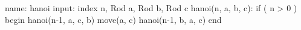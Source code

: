  \begin{algorithm}[language=pseudo,caption={Towers of Hanoi, recursive}]
   name: hanoi
   input: index n, Rod a, Rod b, Rod c
   hanoi(n, a, b, c):
   if ( n > 0 ) begin
   hanoi(n-1, a, c, b)
   move(a, c)
   hanoi(n-1, b, a, c)
   end
 \end{algorithm}